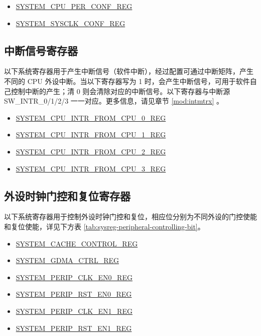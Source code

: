 \documentclass[main\_\_CN.tex]{subfiles}
\begin{document}
\begin{itemize}
    \item \hyperref[regdesc:SYSTEMCPUPERCONFREG]{SYSTEM\_CPU\_PER\_CONF\_REG}
    \item \hyperref[regdesc:SYSTEMSYSCLKCONFREG]{SYSTEM\_SYSCLK\_CONF\_REG}
\end{itemize}

\subsection{中断信号寄存器}

以下系统寄存器用于产生中断信号（软件中断），经过配置可通过中断矩阵，产生不同的 CPU 外设中断。当以下寄存器写为 1 时，会产生中断信号，可用于软件自己控制中断的产生；清 0 则会清除对应的中断信号。以下寄存器与中断源 SW\_INTR\_0/1/2/3 一一对应。更多信息，请见章节 \ref{mod:intmtrx}
\textit{}。

\begin{itemize}
    \item \hyperref[regdesc:SYSTEMCPUINTRFROMCPU0REG]{SYSTEM\_CPU\_INTR\_FROM\_CPU\_0\_REG}
    \item \hyperref[regdesc:SYSTEMCPUINTRFROMCPU1REG]{SYSTEM\_CPU\_INTR\_FROM\_CPU\_1\_REG}
    \item \hyperref[regdesc:SYSTEMCPUINTRFROMCPU2REG]{SYSTEM\_CPU\_INTR\_FROM\_CPU\_2\_REG}
    \item \hyperref[regdesc:SYSTEMCPUINTRFROMCPU3REG]{SYSTEM\_CPU\_INTR\_FROM\_CPU\_3\_REG}
\end{itemize}



\subsection{外设时钟门控和复位寄存器}

以下系统寄存器用于控制外设时钟门控和复位，相应位分别为不同外设的门控使能和复位使能，详见下方表 \ref{tab:sysreg-peripheral-controlling-bit}。

\begin{itemize}
    \item \hyperref[regdesc:SYSTEMCACHECONTROLREG]{SYSTEM\_CACHE\_CONTROL\_REG}
    \item \hyperref[regdesc:SYSTEMGDMACTRLREG]{SYSTEM\_GDMA\_CTRL\_REG}
    \item \hyperref[regdesc:SYSTEMPERIPCLKEN0REG]{SYSTEM\_PERIP\_CLK\_EN0\_REG}
    \item \hyperref[regdesc:SYSTEMPERIPRSTEN0REG]{SYSTEM\_PERIP\_RST\_EN0\_REG}
    \item \hyperref[regdesc:SYSTEMPERIPCLKEN1REG]{SYSTEM\_PERIP\_CLK\_EN1\_REG}
    \item \hyperref[regdesc:SYSTEMPERIPRSTEN1REG]{SYSTEM\_PERIP\_RST\_EN1\_REG}

\end{itemize}
\end{document}
